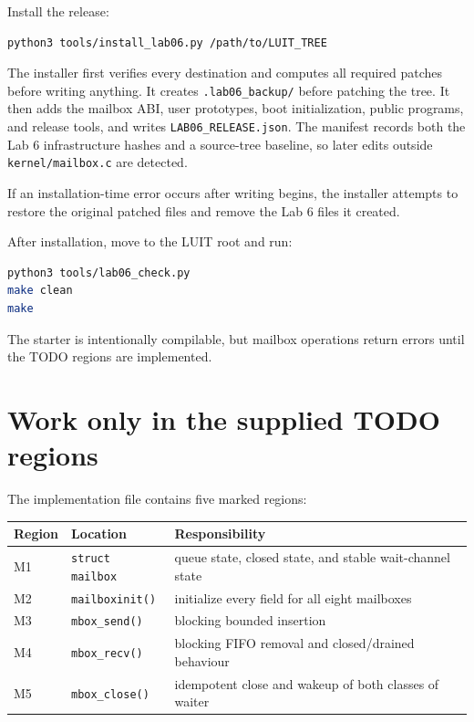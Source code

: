 \documentclass[11pt,a4paper]{article}
\newcommand{\file}[1]{\texttt{#1}}
\begin{document}
Install the release:

\begin{lstlisting}[language=bash]
python3 tools/install_lab06.py /path/to/LUIT_TREE
\end{lstlisting}

The installer first verifies every destination and computes all required patches before writing anything. It creates \file{.lab06\_backup/} before patching the tree. It then adds the mailbox ABI, user prototypes, boot initialization, public programs, and release tools, and writes \file{LAB06\_RELEASE.json}. The manifest records both the Lab 6 infrastructure hashes and a source-tree baseline, so later edits outside \file{kernel/mailbox.c} are detected.

If an installation-time error occurs after writing begins, the installer attempts to restore the original patched files and remove the Lab 6 files it created.

After installation, move to the LUIT root and run:

\begin{lstlisting}[language=bash]
python3 tools/lab06_check.py
make clean
make
\end{lstlisting}

The starter is intentionally compilable, but mailbox operations return errors until the TODO regions are implemented.

\section{Work only in the supplied TODO regions}

The implementation file contains five marked regions:

\begin{center}
\begin{tabularx}{0.92\textwidth}{@{}p{18mm}p{34mm}X@{}}
\toprule
\textbf{Region} & \textbf{Location} & \textbf{Responsibility} \\
\midrule
M1 & \file{struct mailbox} & queue state, closed state, and stable wait-channel state \\
M2 & \file{mailboxinit()} & initialize every field for all eight mailboxes \\
M3 & \file{mbox\_send()} & blocking bounded insertion \\
M4 & \file{mbox\_recv()} & blocking FIFO removal and closed/drained behaviour \\
M5 & \file{mbox\_close()} & idempotent close and wakeup of both classes of waiter \\
\bottomrule
\end{tabularx}
\end{center}
\end{document}
